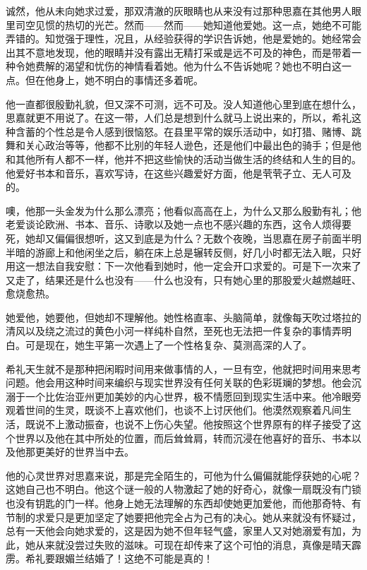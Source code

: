 \par 诚然，他从未向她求过爱，那双清澈的灰眼睛也从来没有过那种思嘉在其他男人眼里司空见惯的热切的光芒。然而——然而——她知道他爱她。这一点，她绝不可能弄错的。知觉强于理性，况且，从经验获得的学识告诉她，他是爱她的。她经常会出其不意地发现，他的眼睛并没有露出无精打采或是远不可及的神色，而是带着一种令她费解的渴望和忧伤的神情看着她。他为什么不告诉她呢？她也不明白这一点。但在他身上，她不明白的事情还多着呢。
\par 他一直都很殷勤礼貌，但又深不可测，远不可及。没人知道他心里到底在想什么，思嘉就更不用说了。在这一带，人们总是想到什么就马上说出来的，所以，希礼这种含蓄的个性总是令人感到很恼怒。在县里平常的娱乐活动中，如打猎、赌博、跳舞和关心政治等等，他都不比别的年轻人逊色，还是他们中最出色的骑手；但是他和其他所有人都不一样，他并不把这些愉快的活动当做生活的终结和人生的目的。他爱好书本和音乐，喜欢写诗，在这些兴趣爱好方面，他是茕茕孑立、无人可及的。
\par 噢，他那一头金发为什么那么漂亮；他看似高高在上，为什么又那么殷勤有礼；他老爱谈论欧洲、书本、音乐、诗歌以及她一点也不感兴趣的东西，这令人烦得要死，她却又偏偏很想听，这又到底是为什么？无数个夜晚，当思嘉在房子前面半明半暗的游廊上和他闲坐之后，躺在床上总是辗转反侧，好几小时都无法入眠，只好用这一想法自我安慰：下一次他看到她时，他一定会开口求爱的。可是下一次来了又走了，结果还是什么也没有——什么也没有，只有她心里的那股爱火越燃越旺、愈烧愈热。
\par 她爱他，她要他，但她却不理解他。她性格直率、头脑简单，就像每天吹过塔拉的清风以及绕之流过的黄色小河一样纯朴自然，至死也无法把一件复杂的事情弄明白。可是现在，她生平第一次遇上了一个性格复杂、莫测高深的人了。
\par 希礼天生就不是那种把闲暇时间用来做事情的人，一旦有空，他就把时间用来思考问题。他会用这种时间来编织与现实世界没有任何关联的色彩斑斓的梦想。他会沉溺于一个比佐治亚州更加美妙的内心世界，极不情愿回到现实生活中来。他冷眼旁观着世间的生灵，既谈不上喜欢他们，也谈不上讨厌他们。他漠然观察着凡间生活，既说不上激动振奋，也说不上伤心失望。他按照这个世界原有的样子接受了这个世界以及他在其中所处的位置，而后耸耸肩，转而沉浸在他喜好的音乐、书本以及他那更美好的世界当中去。
\par 他的心灵世界对思嘉来说，那是完全陌生的，可他为什么偏偏就能俘获她的心呢？这她自己也不明白。他这个谜一般的人物激起了她的好奇心，就像一扇既没有门锁也没有钥匙的门一样。他身上她无法理解的东西却使她更加爱他，而他那奇特、有节制的求爱只是更加坚定了她要把他完全占为己有的决心。她从来就没有怀疑过，总有一天他会向她求爱的，这是因为她不但年轻气盛，家里人又对她溺爱有加，为此，她从来就没尝过失败的滋味。可现在却传来了这个可怕的消息，真像是晴天霹雳。希礼要跟媚兰结婚了！这绝不可能是真的！
